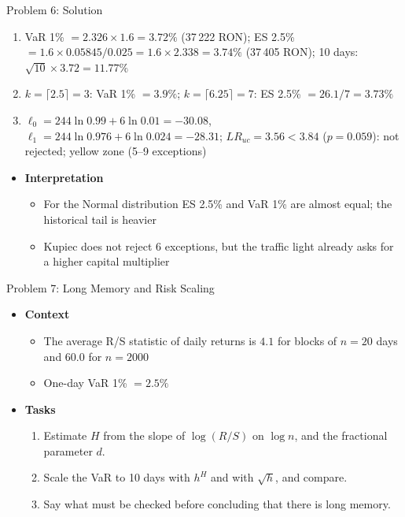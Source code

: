 \begin{frame}{Problem 6: Solution}
\itemsize{\footnotesize}
\begin{enumerate}
    \item VaR 1\% $= 2.326 \times 1.6 = 3.72\%$ (37\,222 RON); ES 2.5\% $= 1.6 \times 0.05845/0.025 = 1.6 \times 2.338 = 3.74\%$ (37\,405 RON); 10 days: $\sqrt{10} \times 3.72 = 11.77\%$
    \item $k = \lceil 2.5 \rceil = 3$: VaR 1\% $= 3.9\%$; $k = \lceil 6.25 \rceil = 7$: ES 2.5\% $= 26.1/7 = 3.73\%$
    \item $\ell_0 = 244\ln 0.99 + 6\ln 0.01 = -30.08$, $\ell_1 = 244\ln 0.976 + 6\ln 0.024 = -28.31$; $LR_{uc} = 3.56 < 3.84$ ($p = 0.059$): not rejected; yellow zone (5--9 exceptions)
\end{enumerate}
\begin{itemize}
    \item \textbf{Interpretation}
    \begin{itemize}
        \item For the Normal distribution ES 2.5\% and VaR 1\% are almost equal; the historical tail is heavier
        \item Kupiec does not reject 6 exceptions, but the traffic light already asks for a higher capital multiplier
    \end{itemize}
\end{itemize}
\end{frame}

\begin{frame}{Problem 7: Long Memory and Risk Scaling}
\itemsize{\footnotesize}
\begin{itemize}
    \item \textbf{Context}
    \begin{itemize}
        \item The average R/S statistic of daily returns is $4.1$ for blocks of $n = 20$ days and $60.0$ for $n = 2000$
        \item One-day VaR 1\% $= 2.5\%$
    \end{itemize}
    \item \textbf{Tasks}
\begin{enumerate}
    \item Estimate $H$ from the slope of $\log(R/S)$ on $\log n$, and the fractional parameter $d$.
    \item Scale the VaR to 10 days with $h^H$ and with $\sqrt{h}$, and compare.
    \item Say what must be checked before concluding that there is long memory.
\end{enumerate}
\end{itemize}
\end{frame}

